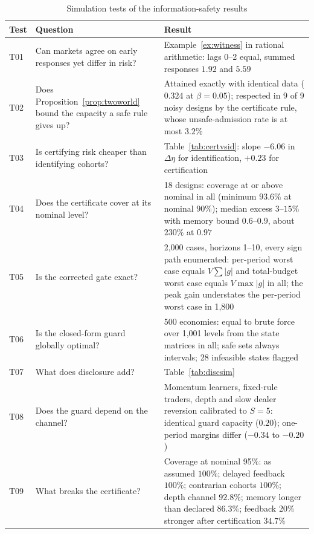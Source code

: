 \begin{table}[!tbp]\centering\footnotesize
\begin{threeparttable}
\caption{Simulation tests of the information-safety results}\label{tab:simtests}
\setlength{\tabcolsep}{3pt}
\begin{tabular}{p{}p{}p{}}
\toprule
Test & Question & Result\\
\midrule
T01 & Can markets agree on early responses yet differ in risk? & Example~\ref{ex:witness} in rational arithmetic: lags 0--2 equal, summed responses $1.92$ and $5.59$\\
T02 & Does Proposition~\ref{prop:twoworld} bound the capacity a safe rule gives up? & Attained exactly with identical data ($0.324$ at $\beta=0.05$); respected in 9 of 9 noisy designs by the certificate rule, whose unsafe-admission rate is at most $3.2\%$\\
T03 & Is certifying risk cheaper than identifying cohorts? & Table~\ref{tab:certvsid}: slope $-6.06$ in $\Delta\eta$ for identification, $+0.23$ for certification\\
T04 & Does the certificate cover at its nominal level? & 18 designs: coverage at or above nominal in all (minimum $93.6\%$ at nominal $90\%$); median excess $3$--$15\%$ with memory bound $0.6$--$0.9$, about $230\%$ at $0.97$\\
T05 & Is the corrected gate exact? & 2{,}000 cases, horizons 1--10, every sign path enumerated: per-period worst case equals $V\sum|g|$ and total-budget worst case equals $V\max|g|$ in all; the peak gain understates the per-period worst case in 1{,}800\\
T06 & Is the closed-form guard globally optimal? & 500 economies: equal to brute force over 1{,}001 levels from the state matrices in all; safe sets always intervals; 28 infeasible states flagged\\
T07 & What does disclosure add? & Table~\ref{tab:discsim}\\
T08 & Does the guard depend on the channel? & Momentum learners, fixed-rule traders, depth and slow dealer reversion calibrated to $S=5$: identical guard capacity ($0.20$); one-period margins differ ($-0.34$ to $-0.20$)\\
T09 & What breaks the certificate? & Coverage at nominal 95\%: as assumed $100\%$; delayed feedback $100\%$; contrarian cohorts $100\%$; depth channel $92.8\%$; memory longer than declared $86.3\%$; feedback 20\% stronger after certification $34.7\%$\\

\end{tabular}
\end{threeparttable}
\end{table}

